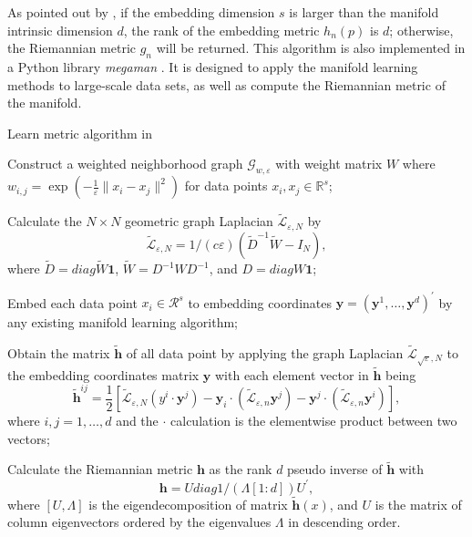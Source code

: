 \documentclass[11pt,a4paper,]{article}
\begin{document}
As pointed out by \textcite{Perrault-Joncas2013-pq}, if the embedding dimension \(s\) is larger than the manifold intrinsic dimension \(d\), the rank of the embedding metric \(h_n(p)\) is \(d\); otherwise, the Riemannian metric \(g_n\) will be returned. This algorithm is also implemented in a Python library \emph{megaman} \autocite{McQueen2016-xz}. It is designed to apply the manifold learning methods to large-scale data sets, as well as compute the Riemannian metric of the manifold.

\begin{algorithm}[!htb]
  \caption{Learn metric algorithm in \cite{Perrault-Joncas2013-pq} }
  \label{alg:learnmetric}
  \DontPrintSemicolon
  \SetAlgoLined
  \BlankLine
  \begin{algorithmic}[1]

  \STATE Construct a weighted neighborhood graph $\mathcal{G}_{w,\varepsilon}$ with weight matrix $W$ where $w_{i,j}=\exp(-\frac{1}{\varepsilon}\|x_i-x_j\|^2)$ for data points $x_i,x_j \in \mathbb{R}^s$;

  \STATE Calculate the $N\times N$ geometric graph Laplacian $\widetilde{\mathcal{L}}_{\varepsilon,N}$ by
  $$
  \widetilde{\mathcal{L}}_{\varepsilon,N} = 1/(c\varepsilon)(\widetilde{D}^{-1} \widetilde{W} - I_N),
  $$
  where $\widetilde{D}=diag{\widetilde{W}\pmb{1}}$, $\widetilde{W} = D^{-1}WD^{-1}$, and $D = diag{W\pmb{1}}$;

  \STATE Embed each data point $x_i\in \mathcal{R}^s$ to embedding coordinates $\pmb{y}=(\pmb{y}^1,\dots,\pmb{y}^d)^\prime$ by any existing manifold learning algorithm;

  \STATE Obtain the matrix $\pmb{\tilde{h}}$ of all data point by applying the graph Laplacian $\widetilde{\mathcal{L}}_{\sqrt{\varepsilon},N}$ to the embedding coordinates matrix $\pmb{y}$ with each element vector in $\pmb{\tilde{h}}$ being
  $$
    \pmb{\tilde{h}}^{i j} = \frac{1}{2} \left[\tilde{\mathcal{L}}_{\varepsilon, N}\left(y^i \cdot \pmb{y}^j\right) - \pmb{y}_i \cdot\left(\tilde{\mathcal{L}}_{\varepsilon, n} \pmb{y}^j\right) - \pmb{y}^j \cdot\left(\tilde{\mathcal{L}}_{\varepsilon, n} \pmb{y}^i\right)\right],
  $$
  where $i,j=1,\dots,d$ and the $\cdot$ calculation is the elementwise product between two vectors; 

  \STATE Calculate the Riemannian metric $\pmb{h}$ as the rank $d$ pseudo inverse of $\tilde{\pmb{    h}}$ with 
  $$
    \pmb{h} = U diag{1/(\Lambda[1:d])} U^\prime,
  $$
  where $[U, \Lambda]$ is the eigendecomposition of matrix $\pmb{\tilde{h}}(x)$, and $U$ is the matrix of column eigenvectors ordered by the eigenvalues $\Lambda$ in descending order.

  \end{algorithmic}
\end{algorithm}
\end{document}
